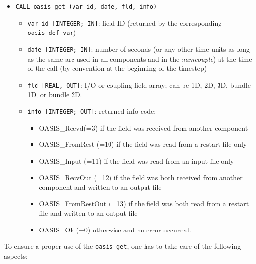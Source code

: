 \begin{itemize}

\item {\tt CALL oasis\_get (var\_id, date, fld, info)}
  \begin{itemize}
  \item {\tt var\_id [INTEGER; IN]}: field ID (returned by the corresponding
    {\tt oasis\_def\_var})
  \item {\tt date [INTEGER; IN]}: number of seconds (or any other time
    units as long as the same are used in all components and in the {\it
      namcouple}) at the time of the call (by convention at the
    beginning of the timestep)
  \item {\tt fld [REAL, OUT]}: I/O or coupling field array;
    can be 1D, 2D, 3D, bundle 1D, or bundle 2D.
  \item {\tt info [INTEGER; OUT]}: returned info code:
    \begin{itemize}
    \item OASIS\_Recvd(=3) if the field was received from another
      component
    \item OASIS\_FromRest (=10) if the field was read from a restart
      file only
    \item OASIS\_Input (=11) if the field was read from an input file
      only
    \item OASIS\_RecvOut (=12) if the field was both received from
      another component and written to an output file
    \item OASIS\_FromRestOut (=13) if the field was both read from a
      restart file and written to an output file
    \item OASIS\_Ok (=0) otherwise and no error occurred.
    \end{itemize}
  \end{itemize}
\end{itemize}

To ensure a proper use of the {\tt oasis\_get}, one has to take care of the following aspects:

